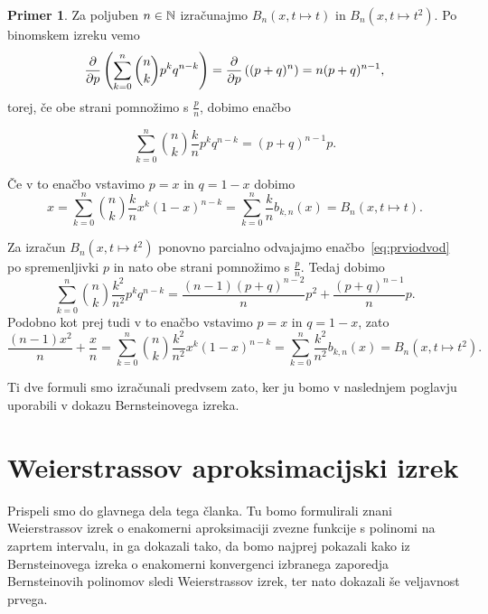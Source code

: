 \documentclass[a4paper, reqno]{amsart}
\theoremstyle{theorem}
\theoremstyle{definition}
\newtheorem{primer}[definicija]{Primer}
\begin{document}
\begin{primer}
	\label{B polinom primer}
	Za poljuben $n \in \mathbb{N}$ izračunajmo $B_n(x, t \mapsto t)$ in $B_n(x, t \mapsto t^2)$. 
	Po binomskem izreku vemo
$$
\pdv{p}\left( \sum_{k=0}^n \binom nk p^k q^{n-k}\right) = \pdv{p}\left((p + q)^n\right) =
n (p + q)^{n - 1}\text{,}
$$
torej, če obe strani pomnožimo s $\frac pn$, dobimo enačbo

\begin{equation}
	\sum_{k=0}^n \binom nk \frac kn p^k q^{n-k} = (p + q)^{n - 1}p\text{.}
	\label{eq:prviodvod}
\end{equation}

Če v to enačbo vstavimo $p = x$ in $q = 1 - x$ dobimo
$$
x = \sum_{k=0}^n \binom nk \frac kn x^k (1 - x)^{n-k} = 
\sum_{k = 0}^n \frac kn b_{k,n}(x) =
B_n(x, t \mapsto t)\text{.}
$$

Za izračun $B_n(x, t \mapsto t^2)$ ponovno parcialno odvajajmo 
enačbo~\eqref{eq:prviodvod} po spremenljivki $p$ in nato obe strani
pomnožimo s $\frac pn$. Tedaj dobimo
$$
\sum_{k=0}^n \binom nk \frac {k^2}{n^2} p^k q^{n-k} = 
\frac {(n - 1)(p + q)^{n - 2}}{n}p^2 + \frac{(p + q)^{n - 1}}{n}p\text{.}
$$
Podobno kot prej tudi v to enačbo vstavimo $p = x$ in $q = 1 - x$, zato
$$
\frac{(n - 1)x^2}{n} + \frac xn = 
\sum_{k=0}^n \binom nk \frac {k^2}{n^2} x^k (1 - x)^{n-k} = 
\sum_{k = 0}^n \frac{k^2}{n^2} b_{k,n}(x) =
B_n(x, t \mapsto t^2)\text{.}
$$

Ti dve formuli smo izračunali predvsem zato, ker ju bomo v naslednjem poglavju uporabili
v dokazu Bernsteinovega izreka.
\end{primer}


\section{Weierstrassov aproksimacijski izrek}

\par
Prispeli smo do glavnega dela tega članka. Tu bomo formulirali znani Weierstrassov
izrek o enakomerni aproksimaciji zvezne funkcije s polinomi na zaprtem intervalu,
in ga dokazali tako, da bomo najprej pokazali kako iz Bernsteinovega izreka o 
enakomerni konvergenci izbranega zaporedja Bernsteinovih polinomov sledi 
Weierstrassov izrek, ter nato dokazali še veljavnost prvega. 
\end{document}

